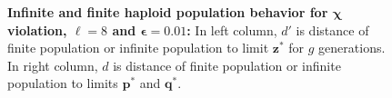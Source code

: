\begin{figure}[!b]
\begin{center}
\hspace{-3em}%
\vspace{-0.5em} \hspace{-3em}%


\caption[\textbf{Infinite and finite haploid population behavior for $\bm{\chi}$ violation, $\ell = 8$ and $\bm{\epsilon} = 0.01$}]
{\textbf{Infinite and finite haploid population behavior for $\bm{\chi}$ violation, $\ell = 8$ and $\bm{\epsilon} = 0.01$:} 
  In left column, $d'$ is distance of finite population or infinite population to limit $\bm{z}^\ast$ for $g$ generations. 
  In right column, $d$ is distance of finite population or infinite population to limits $\bm{p}^\ast$ and $\bm{q}^\ast$.}
\label{oscillation_8h_vio_chi_0.01}
\end{center}
\end{figure}



